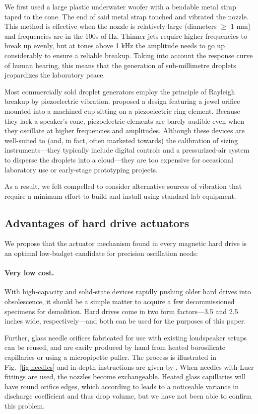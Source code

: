 \documentclass[11.5pt,oneside]{book}
\newcommand*{\figref}[1]{Fig.~\ref{#1}}
\begin{document}
We first used a large plastic underwater woofer with a bendable metal strap taped to
the cone. The end of said metal strap touched and vibrated the nozzle. This
method is effective when the nozzle is relatively large (diameters $\geq$ 1 mm)
and frequencies are in the 100s of Hz. Thinner jets require higher frequencies
to break up evenly, but at tones above 1 kHz the amplitude needs to go up
considerably to ensure a reliable breakup. Taking into account the response
curve of human hearing, this means that the generation of sub-millimetre
droplets jeopardizes the laboratory peace.

Most commercially sold droplet generators employ the principle of Rayleigh breakup by
piezoelectric vibration. \citet{Berglund73} proposed a design featuring a jewel
orifice mounted into a machined cup sitting on a piezoelectric ring element.
Because they lack a speaker's cone, piezoelectric elements are barely audible
even when they oscillate at higher frequencies and amplitudes. Although these
devices are well-suited to (and, in fact, often marketed towards) the
calibration of sizing instruments—they typically include digital controls and a
pressurized-air system to disperse the droplets into a cloud—they are too
expensive for occasional laboratory use or early-stage prototyping projects.

As a result, we felt compelled to
consider alternative sources of vibration that require a minimum effort to build
and install using standard lab equipment.

\subsection{Advantages of hard drive actuators}
We propose that the actuator mechanism
found in every magnetic hard drive is an optimal low-budget candidate for
precision oscillation needs:

\paragraph*{Very low cost.} With high-capacity and solid-state devices rapidly pushing older hard drives
into obsolescence, it should be a simple matter to acquire a few decommissioned specimens for
demolition. Hard drives come in two form factors---3.5 and 2.5 inches wide,
respectively---and both can be used for the purposes of this paper. 

Further, glass needle orifices fabricated for use with existing loudspeaker setups can be
reused, and are easily produced by hand from heated borosilicate capillaries or
using a micropipette puller. The process is illustrated in \figref{fig:needles}
and in-depth instructions are given by \citet{Lee02}. When needles with Luer
fittings are used, the nozzles become exchangeable. Heated glass capillaries
will have round orifice edges, which according to
\citet{Dressler90} leads to a noticeable variance in discharge coefficient and
thus drop volume, but we have not been able to confirm this problem.
\end{document}

